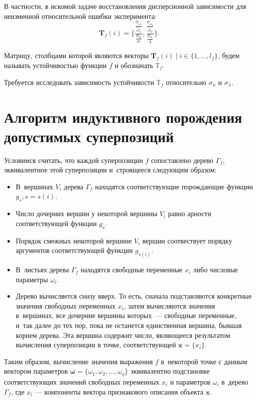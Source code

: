 \documentclass[12pt,a4paper]{article}
\begin{document}
В частности, в искомой задаче восстановления дисперсионной зависимости для неизменной
относительной ошибки эксперимента:
\[
  \mathbf{T}_f(i) = \Big\{ \frac{\frac{\sigma_{\omega_i}}{\hat{\omega}_i}}{\frac{\sigma_n}{n}}, \frac{\frac{\sigma_{\omega_i}}{\hat{\omega}_i}}{\frac{\sigma_{\lambda}}{\lambda}} \Big\}.
\]

Матрицу, столбцами которой являются векторы $\mathbf{T}_f(i) \mid i \in \{ 1, \dots, l_f \}$,
будем называть устойчивостью функции $f$ и обозначать $\mathbb{T}_f$.

Требуется исследовать зависимость устойчивости $\mathbb{T}_{\hat{f}}$ относительно
$\sigma_n$ и $\sigma_{\lambda}$.

\section{Алгоритм индуктивного порождения допустимых суперпозиций}

Условимся считать, что каждой суперпозиции $f$ сопоставлено дерево $\Gamma_f$,
эквивалентное этой суперпозиции и~строящееся следующим образом:

\begin{itemize}
  \item В~вершинах $V_i$ дерева $\Gamma_f$ находятся соответствующие
	порождающие функции $g_s, s = s(i)$.
  \item Число дочерних вершин у некоторой вершины $V_i$ равно арности
	соответствующей функции $g_s$.
  \item Порядок смежных некоторой вершине $V_i$ вершин соотвествует порядку
	аргументов соответствующей функции $g_{s(i)}$.
  \item В~листьях дерева $\Gamma_f$ находятся свободные переменные $x_i$
	либо числовые параметры $\omega_i$.
  \item Дерево вычисляется снизу вверх. То есть, сначала подставляются
	конкретные значения свободных переменных $x_i$,
	затем вычисляются значения в~вершинах, все дочерние вершины которых~---
	свободные переменные, и~так далее до тех пор, пока не останется
	единственная вершина, бывшая корнем дерева. Эта вершина содержит
	число, являющееся результатом вычисления суперпозиции в точке,
	соответствующей $\mathbf{x} = \{ x_i \}$.
\end{itemize}

Таким образом, вычисление значения выражения $f$ в~некоторой точке с данным
вектором параметров $\boldsymbol{\omega} = \{ \omega_1, \omega_2, \dots, \omega_\eta\}$
эквивалентно подстановке соответствующих значений свободных переменных $x_i$
и параметров $\omega_i$ в~дерево $\Gamma_f$, где $x_i$ --- компоненты
вектора признакового описания объекта $\mathbf{x}$.
\end{document}
